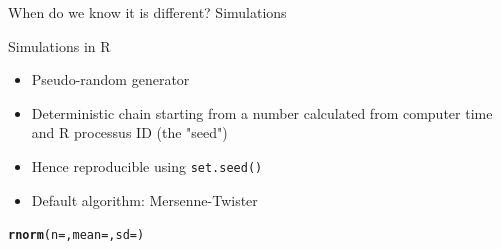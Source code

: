 \documentclass[10pt]{beamer}\usepackage[]{graphicx}\usepackage[]{color}
\makeatletter
\newcommand{\hlstd}[1]{\textcolor[rgb]{0.345,0.345,0.345}{#1}}%
\newcommand{\hlkwc}[1]{\textcolor[rgb]{0.333,0.667,0.333}{#1}}%
\newcommand{\hlkwd}[1]{\textcolor[rgb]{0.737,0.353,0.396}{\textbf{#1}}}%
\newenvironment{kframe}{%
 \def\at@end@of@kframe{}%
 \ifinner\ifhmode%
  \def\at@end@of@kframe{\end{minipage}}%
  \begin{minipage}{\columnwidth}%
 \fi\fi%
 \def\FrameCommand##1{\hskip\@totalleftmargin \hskip-\fboxsep
 \colorbox{shadecolor}{##1}\hskip-\fboxsep
     \hskip-\linewidth \hskip-\@totalleftmargin \hskip\columnwidth}%
 \MakeFramed {\advance\hsize-\width
   \@totalleftmargin\z@ \linewidth\hsize
   \@setminipage}}%
 {\par\unskip\endMakeFramed%
 \at@end@of@kframe}
\newenvironment{knitrout}{}{} %
\makeatother
\begin{document}
\begin{frame}[fragile]{When do we know it is different? Simulations}

\begin{block}{Simulations in R}
  \begin{itemize}
    \item Pseudo-random generator
    \item Deterministic chain starting from a number calculated from computer time and R processus ID (the "seed")
    \item Hence reproducible using \texttt{set.seed()}
    \item Default algorithm: Mersenne-Twister
  \end{itemize}

\begin{knitrout}
\color{fgcolor}\begin{kframe}
\begin{alltt}
  \hlkwd{rnorm}\hlstd{(}\hlkwc{n} \hlstd{= ,} \hlkwc{mean} \hlstd{= ,} \hlkwc{sd} \hlstd{= )}
\end{alltt}
\end{kframe}
\end{knitrout}

\end{block}

\end{frame}
  
\end{document}
